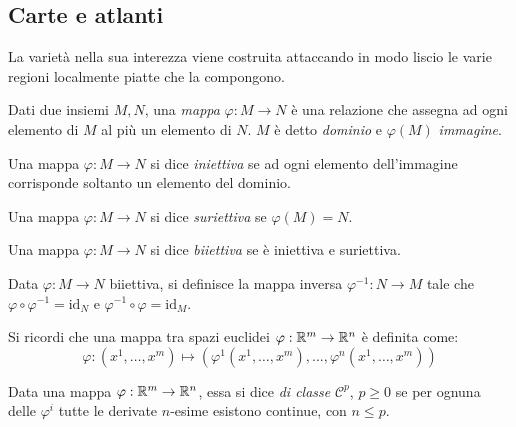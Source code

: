 \subsection{Carte e atlanti}

La varietà nella sua interezza viene costruita attaccando in modo liscio le varie regioni localmente piatte che la compongono.

\begin{definition}
	Dati due insiemi $ M,N $, una \textit{mappa} $ \varphi : M \rightarrow N $ è una relazione che assegna ad ogni elemento di $ M $ al più un elemento di $ N $. $ M $ è detto \textit{dominio} e $ \varphi(M) $ \textit{immagine}.
\end{definition}

\begin{definition}
	Una mappa $ \varphi : M \rightarrow N $ si dice \textit{iniettiva} se ad ogni elemento dell'immagine corrisponde soltanto un elemento del dominio.
\end{definition}

\begin{definition}
	Una mappa $ \varphi : M \rightarrow N $ si dice \textit{suriettiva} se $ \varphi(M) = N $.
\end{definition}

\begin{definition}
	Una mappa $ \varphi : M \rightarrow N $ si dice \textit{biiettiva} se è iniettiva e suriettiva.
\end{definition}

\begin{definition}
	Data $ \varphi : M \rightarrow N $ biiettiva, si definisce la mappa inversa $ \varphi^{-1} : N \rightarrow M $ tale che $ \varphi \circ \varphi^{-1} = \text{id}_N $ e $ \varphi^{-1} \circ \varphi = \text{id}_M $.
\end{definition}

Si ricordi che una mappa tra spazi euclidei $ \varphi : \mathbb{R}^m \rightarrow \mathbb{R}^n $ è definita come:
\begin{equation}
	\varphi : (x^1,\dots,x^m) \mapsto (\varphi^1(x^1,\dots,x^m),\dots,\varphi^n(x^1,\dots,x^m))
	\label{eq:6.1}
\end{equation}

\begin{definition}
	Data una mappa $ \varphi : \mathbb{R}^m \rightarrow \mathbb{R}^n $, essa si dice \textit{di classe} $ \mathcal{C}^p $, $ p \ge 0 $ se per ognuna delle $ \varphi^i $ tutte le derivate $ n $-esime esistono continue, con $ n \le p $.
\end{definition}

